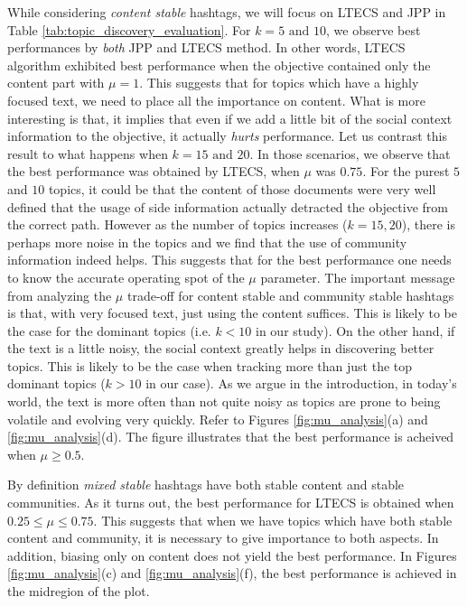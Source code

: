 While considering \emph{content stable} hashtags, we will focus on LTECS and JPP
in Table \ref{tab:topic_discovery_evaluation}. For $k = 5 \text{ and } 10$, we observe best
performances by \emph{both} JPP and LTECS method.  In other words, LTECS
algorithm exhibited best performance when the objective contained only the content part with $\mu = 1$.  
This suggests that for topics which have a highly focused text, we need to place all the 
importance on content.  What is more interesting is that, it implies that even if we add a little
bit of the social context information to the objective, it actually \emph{hurts} performance.
Let us contrast this result to what happens when $k = 15 \text{ and } 20$.
In those scenarios, we observe that the best performance was
obtained by LTECS, when $\mu$ was $0.75$.  
For the purest $5$ and $10$ topics, it could be that the content of those documents 
were very well defined that the usage of side information actually detracted the objective 
from the correct path.  However as the number of topics
increases ($k = 15, 20$), there is perhaps more noise in the topics and
we find that the use of community information indeed helps.  
This suggests that for the best performance one needs to know the accurate
operating spot of the $\mu$ parameter.  
The important message from analyzing the $\mu$ trade-off for content stable and community
stable hashtags is that, with very focused text, just using the content suffices. This is likely to be the case for the dominant topics (i.e. $k<10$ in our study).
On the other hand, if the text is a little noisy, the social context greatly
helps in discovering better topics. 
This is likely to be the case when tracking more than just the top dominant topics ($k>10$ in our case).  
As we argue in the introduction, in today's world,
the text is more often than not quite noisy as topics are prone to being volatile and evolving
very quickly.  Refer to Figures \ref{fig:mu_analysis}(a) and \ref{fig:mu_analysis}(d).  The figure
illustrates that the best performance is acheived when $\mu \geq 0.5$.

By definition \emph{mixed stable} hashtags have both stable content and stable communities.  
As it turns out, the best performance for LTECS is obtained when $0.25 \leq \mu \leq 0.75$.
This suggests that when we have topics which have both stable content and community,
it is necessary to give importance to both aspects.  In addition, biasing only on content
does not yield the best performance.  In Figures \ref{fig:mu_analysis}(c) and \ref{fig:mu_analysis}(f),
the best performance is achieved in the midregion of the plot.
